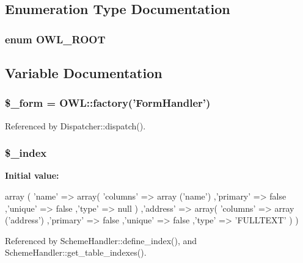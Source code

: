 \subsection{Enumeration Type Documentation}
\subsubsection[{OWL\_\-ROOT}]{\setlength{\rightskip}{0pt plus 5cm}enum {\bf OWL\_\-ROOT}}\label{index_8php_a35612f9a6bd7277982731a74593272c4}


\subsection{Variable Documentation}
\subsubsection[{\$\_\-form}]{\setlength{\rightskip}{0pt plus 5cm}\$\_\-form = OWL::factory('{\bf FormHandler}')}\label{index_8php_ab14b242803551e0f269742a7103f149d}


Referenced by Dispatcher::dispatch().

\subsubsection[{\$\_\-index}]{\setlength{\rightskip}{0pt plus 5cm}\$\_\-index}\label{index_8php_a8fba9293fc0e3b428610c8208c00297d}
{\bfseries Initial value:}
\begin{DoxyCode}
 array (
         'name' => array(
                         'columns' => array ('name')
                        ,'primary' => false
                        ,'unique' => false
                        ,'type' => null
        )
        ,'address' => array(
                         'columns' => array ('address')
                        ,'primary' => false
                        ,'unique' => false
                        ,'type' => 'FULLTEXT'
        )
)
\end{DoxyCode}


Referenced by SchemeHandler::define\_\-index(), and SchemeHandler::get\_\-table\_\-indexes().

